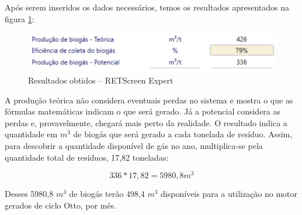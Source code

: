 Após serem inseridos os dados necessários, temos os resultados apresentados na figura \ref{fig:ret3}:

\begin{figure}[!htb]
\centering
\includegraphics[width=\textwidth]{figuras/ret3.png}
\caption{Resultados obtidos – RETScreen Expert}
\label{fig:ret3}
\end{figure}

A produção teórica não considera eventuais perdas no sistema e mostra o que as fórmulas matemáticas indicam o que será gerado. Já a potencial considera as perdas e, provavelmente, chegará mais perto da realidade. O resultado indica a quantidade em $m^{3}$ de biogás que será gerado a cada tonelada de resíduo. Assim, para descobrir a quantidade disponível de gás no ano, multiplica-se pela quantidade total de resíduos, 17,82 toneladas:

\[336 * 17,82 = 5980,8 m^{3}\]

Desses 5980,8 $m^{3}$ de biogás terão 498,4 $m^{3}$ disponíveis para a utilização no motor gerados de ciclo Otto, por mês.

